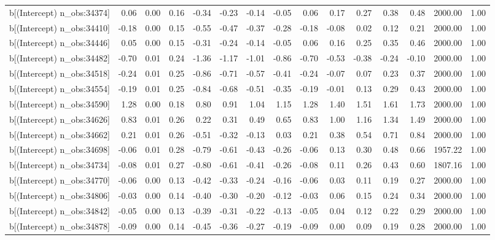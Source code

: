 \begin{table}[ht]
\begin{tabular}{rrrrrrrrrrrrrrr}
  b[(Intercept) n\_obs:34374] & 0.06 & 0.00 & 0.16 & -0.34 & -0.23 & -0.14 & -0.05 & 0.06 & 0.17 & 0.27 & 0.38 & 0.48 & 2000.00 & 1.00 \\ 
  b[(Intercept) n\_obs:34410] & -0.18 & 0.00 & 0.15 & -0.55 & -0.47 & -0.37 & -0.28 & -0.18 & -0.08 & 0.02 & 0.12 & 0.21 & 2000.00 & 1.00 \\ 
  b[(Intercept) n\_obs:34446] & 0.05 & 0.00 & 0.15 & -0.31 & -0.24 & -0.14 & -0.05 & 0.06 & 0.16 & 0.25 & 0.35 & 0.46 & 2000.00 & 1.00 \\ 
  b[(Intercept) n\_obs:34482] & -0.70 & 0.01 & 0.24 & -1.36 & -1.17 & -1.01 & -0.86 & -0.70 & -0.53 & -0.38 & -0.24 & -0.10 & 2000.00 & 1.00 \\ 
  b[(Intercept) n\_obs:34518] & -0.24 & 0.01 & 0.25 & -0.86 & -0.71 & -0.57 & -0.41 & -0.24 & -0.07 & 0.07 & 0.23 & 0.37 & 2000.00 & 1.00 \\ 
  b[(Intercept) n\_obs:34554] & -0.19 & 0.01 & 0.25 & -0.84 & -0.68 & -0.51 & -0.35 & -0.19 & -0.01 & 0.13 & 0.29 & 0.43 & 2000.00 & 1.00 \\ 
  b[(Intercept) n\_obs:34590] & 1.28 & 0.00 & 0.18 & 0.80 & 0.91 & 1.04 & 1.15 & 1.28 & 1.40 & 1.51 & 1.61 & 1.73 & 2000.00 & 1.00 \\ 
  b[(Intercept) n\_obs:34626] & 0.83 & 0.01 & 0.26 & 0.22 & 0.31 & 0.49 & 0.65 & 0.83 & 1.00 & 1.16 & 1.34 & 1.49 & 2000.00 & 1.00 \\ 
  b[(Intercept) n\_obs:34662] & 0.21 & 0.01 & 0.26 & -0.51 & -0.32 & -0.13 & 0.03 & 0.21 & 0.38 & 0.54 & 0.71 & 0.84 & 2000.00 & 1.00 \\ 
  b[(Intercept) n\_obs:34698] & -0.06 & 0.01 & 0.28 & -0.79 & -0.61 & -0.43 & -0.26 & -0.06 & 0.13 & 0.30 & 0.48 & 0.66 & 1957.22 & 1.00 \\ 
  b[(Intercept) n\_obs:34734] & -0.08 & 0.01 & 0.27 & -0.80 & -0.61 & -0.41 & -0.26 & -0.08 & 0.11 & 0.26 & 0.43 & 0.60 & 1807.16 & 1.00 \\ 
  b[(Intercept) n\_obs:34770] & -0.06 & 0.00 & 0.13 & -0.42 & -0.33 & -0.24 & -0.16 & -0.06 & 0.03 & 0.11 & 0.19 & 0.27 & 2000.00 & 1.00 \\ 
  b[(Intercept) n\_obs:34806] & -0.03 & 0.00 & 0.14 & -0.40 & -0.30 & -0.20 & -0.12 & -0.03 & 0.06 & 0.15 & 0.24 & 0.34 & 2000.00 & 1.00 \\ 
  b[(Intercept) n\_obs:34842] & -0.05 & 0.00 & 0.13 & -0.39 & -0.31 & -0.22 & -0.13 & -0.05 & 0.04 & 0.12 & 0.22 & 0.29 & 2000.00 & 1.00 \\ 
  b[(Intercept) n\_obs:34878] & -0.09 & 0.00 & 0.14 & -0.45 & -0.36 & -0.27 & -0.19 & -0.09 & 0.00 & 0.09 & 0.19 & 0.28 & 2000.00 & 1.00 \\ 

\end{tabular}
\end{table}
